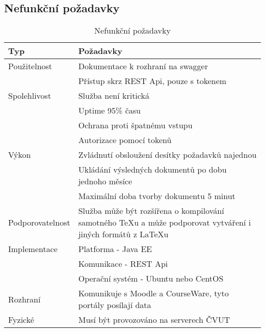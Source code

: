  \subsection{Nefunkční požadavky}
 
 \begin{table}[H]
 	\begin{center}
 		\begin{tabular}{ p{4cm} P{8,6cm} }
 			\textbf{Typ} & \textbf{Požadavky} \\
 			\midrule[0,15em]
 			Použitelnost & \tabitem Dokumentace k rozhraní na swagger \footnotemark \\
 						& \tabitem Přístup skrz REST Api, pouze s tokenem\\
 			\midrule		
 			Spolehlivost & \tabitem Služba není kritická\\
 						& \tabitem Uptime 95\% času\\ 
 						& \tabitem Ochrana proti špatnému vstupu\\
 						& \tabitem Autorizace pomocí tokenů\\
 			\midrule
 			Výkon & \tabitem Zvládnutí obsloužení desítky požadavků najednou\\
 						& \tabitem Ukládání výsledných dokumentů po dobu jednoho měsíce\\
 						& \tabitem Maximální doba tvorby dokumentu 5 minut\\	
			\midrule
			Podporovatelnost & \tabitem Služba může být rozšířena o kompilování samotného TeXu a může podporovat vytváření i jiných formátů z \LaTeX u\\	
			\midrule
			Implementace & \tabitem Platforma - Java EE\\
						& \tabitem Komunikace - REST Api\\
						& \tabitem Operační systém - Ubuntu nebo CentOS\\
			\midrule
 			Rozhraní & \tabitem Komunikuje s Moodle a CourseWare, tyto portály posílají data\\
 			\midrule
 			Fyzické & \tabitem Musí být provozováno na serverech ČVUT\\
 	\end{tabular}
 	\end{center}
 	\caption{Nefunkční požadavky}
 	\label{tab:errors}
 \end{table}
 
